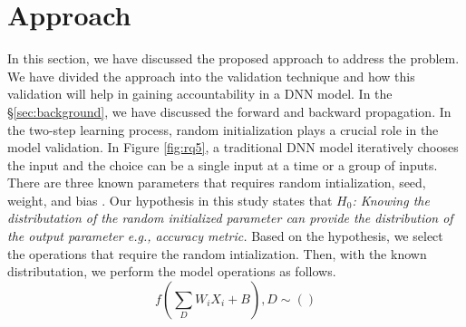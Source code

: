 \section{Approach}
\label{sec:approach}
In this section, we have discussed the proposed approach to address the problem. We have divided the approach into the validation technique and how this validation will help in gaining accountability in a DNN model. In the \S\ref{sec:background}, we have discussed the forward and backward propagation. In the two-step learning process, random initialization plays a crucial role in the model validation. In Figure \ref{fig:rq5}, a traditional DNN model iteratively chooses the input and the choice can be a single input at a time or a group of inputs. There are three known parameters that requires random intialization, seed, weight, and bias \cite{sutskever2013importance}. Our hypothesis in this study states that \emph{$H_0$: Knowing the distributation of the random initialized parameter can provide the distribution of the output parameter e.g., accuracy metric.} Based on the hypothesis, we select the operations that require the random intialization. Then, with the known distributation, we perform the model operations as follows.
\begin{equation}
f(\sum_{D}{W_iX_i+B}), D\sim()
\end{equation}

